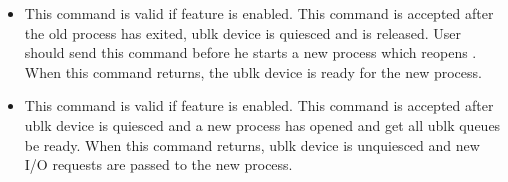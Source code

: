 \documentclass[a4paper,11pt,english]{sphinxmanual}
\begin{document}
\begin{itemize}
\begin{quote}
If ublk server doesn\textquotesingle{}t support :

 is always sent to kernel, and the feature of
UBLK\_F\_UNPRIVILEGED\_DEV isn\textquotesingle{}t available for user
\end{quote}
\begin{enumerate}
%
\setcounter{enumi}{1}
\item {} 
if kernel isn\textquotesingle{}t capable of handling 

\end{enumerate}
\begin{quote}

If ublk server supports :

 is tried first, and will be failed, then
 needs to be retried given
 can\textquotesingle{}t be set

If ublk server doesn\textquotesingle{}t support :

 is always sent to kernel, and the feature of
 isn\textquotesingle{}t available for user
\end{quote}

\item {} 

This command is valid if  feature is enabled. This
command is accepted after the old process has exited, ublk device is quiesced
and  is released. User should send this command before he starts
a new process which re\sphinxhyphen{}opens . When this command returns, the
ublk device is ready for the new process.

\item {} 

This command is valid if  feature is enabled. This
command is accepted after ublk device is quiesced and a new process has
opened  and get all ublk queues be ready. When this command
returns, ublk device is unquiesced and new I/O requests are passed to the
new process.


\end{itemize}
\end{document}
